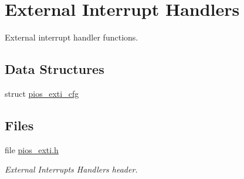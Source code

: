 \hypertarget{group___p_i_o_s___e_x_t_i}{\section{\-External \-Interrupt \-Handlers}
\label{group___p_i_o_s___e_x_t_i}
}


\-External interrupt handler functions.  


\subsection*{\-Data \-Structures}
\begin{DoxyCompactItemize}
\item 
struct \hyperlink{structpios__exti__cfg}{pios\-\_\-exti\-\_\-cfg}
\end{DoxyCompactItemize}
\subsection*{\-Files}
\begin{DoxyCompactItemize}
\item 
file \hyperlink{pios__exti_8h}{pios\-\_\-exti.\-h}
\begin{DoxyCompactList}\small\item\em \-External \-Interrupts \-Handlers header. \end{DoxyCompactList}\end{DoxyCompactItemize}
